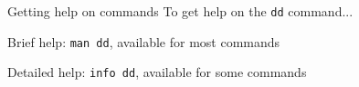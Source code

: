 \begin{block}{Getting help on commands}
  To get help on the \texttt{dd} command...
  \begin{indented_itemize}
  \item Brief help: \texttt{man dd}, available for most commands
  \item Detailed help: \texttt{info dd}, available for some commands
  \end{indented_itemize}
\end{block}

